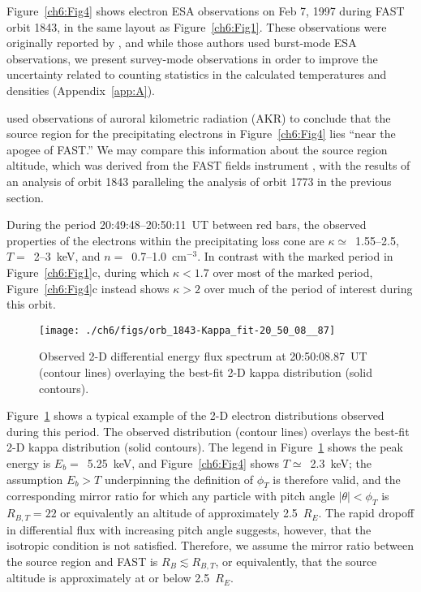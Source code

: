 
  Figure~\ref{ch6:Fig4} shows electron ESA observations on Feb 7, 1997 during
  FAST orbit 1843, in the same layout as Figure~\ref{ch6:Fig1}. These
  observations were originally reported by \citet{Ergun1998a,Ergun1998}, and
  while those authors used burst-mode ESA observations, we present survey-mode
  observations in order to improve the uncertainty related to counting
  statistics in the calculated temperatures and densities
  (Appendix~\ref{app:A}).

  \citet{Ergun1998} used observations of auroral kilometric radiation (AKR) to
  conclude that the source region for the precipitating electrons in
  Figure~\ref{ch6:Fig4} lies ``near the apogee of FAST.''  We may compare this
  information about the source region altitude, which was derived from the FAST
  fields instrument \citep{Ergun2001}, with the results of an analysis of orbit
  1843 paralleling the analysis of orbit 1773 in the previous section.

  During the period 20:49:48--20:50:11~UT between red bars, the observed
  properties of the electrons within the precipitating loss cone are $\kappa
  \simeq $~1.55--2.5, $T =$~2--3~keV, and $n =$~0.7--1.0~cm$^{-3}$. In contrast
  with the marked period in Figure~\ref{ch6:Fig1}c, during which $\kappa < 1.7$
  over most of the marked period, Figure~\ref{ch6:Fig4}c instead shows $\kappa >
  2$ over much of the period of interest during this orbit.


  \begin{figure}
    \centering
    \noindent\texttt{[image: ./ch6/figs/orb\_1843-Kappa\_fit-20\_50\_08\_\_87]}
    \caption[Example two-dimensional fit of inverted V precipitation (Orbit
    1843)]{Observed 2-D differential energy flux spectrum at 20:50:08.87~UT
      (contour lines) overlaying the best-fit 2-D kappa distribution (solid
      contours).}
    \label{ch6:Fig5}
  \end{figure}


  Figure~\ref{ch6:Fig5} shows a typical example of the 2-D electron
  distributions observed during this period. The observed distribution (contour
  lines) overlays the best-fit 2-D kappa distribution (solid contours). The
  legend in Figure~\ref{ch6:Fig5} shows the peak energy is $E_b =$~5.25~keV, and
  Figure~\ref{ch6:Fig4} shows $T \simeq$~2.3~keV; the assumption $E_b > T$
  underpinning the definition of $\phi_T$ is therefore valid, and the
  corresponding mirror ratio for which any particle with pitch angle $\vert
  \theta \vert < \phi_T$ is $R_{B,T} = 22$ or equivalently an altitude of
  approximately 2.5~$R_E$. The rapid dropoff in differential flux with
  increasing pitch angle suggests, however, that the isotropic condition is not
  satisfied. Therefore, we assume the mirror ratio between the source region and
  FAST is $R_B \lesssim R_{B,T}$, or equivalently, that the source altitude is
  approximately at or below 2.5~$R_E$.

